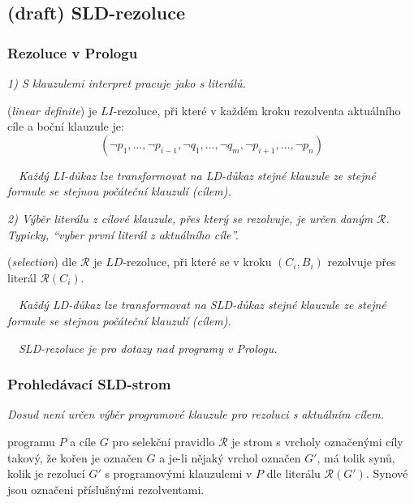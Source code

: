 \subsection{(draft) SLD-rezoluce}\todo



\subsubsection*{Rezoluce v Prologu}
\emph{1) S klauzulemi interpret pracuje jako s  literálů.}


 (\emph{linear definite}) je $LI$-rezoluce, při které v každém kroku rezolventa aktuálního cíle  a boční
klauzule  je:
$$(\neg p_1, \dots, \neg p_{i-1},\neg q_1, \dots, \neg q_m, \neg p_{i+1},\dots, \neg p_n)$$

{\bf {}}\ \ {\it Každý LI-důkaz lze transformovat na LD-důkaz stejné klauzule}
{\it ze stejné formule se stejnou počáteční klauzulí (cílem).}

\medskip

\noindent \emph{2) Výběr literálu z cílové klauzule, přes který se rezolvuje, je určen daným}
\emph{ $\mathcal{R}$. Typicky, ``vyber první literál z aktuálního cíle''.}

 (\emph{selection}) dle $\mathcal{R}$ je $LD$-rezoluce, při které se v kroku $(C_i,B_i)$
rezolvuje přes literál $\mathcal{R}(C_i)$.

\medskip

{\bf {}}\ \ {\it Každý LD-důkaz lze transformovat na SLD-důkaz stejné}
{\it klauzule ze stejné formule se stejnou počáteční klauzulí (cílem).}

\medskip

{\bf {}}\ \ {\it SLD-rezoluce je  pro dotazy nad programy v Prologu.}



\subsubsection*{Prohledávací SLD-strom}
{\it Dosud není určen výběr programové klauzule pro rezoluci s aktuálním cílem.}

 programu $P$ a cíle $G$ pro selekční pravidlo $\mathcal{R}$ je strom s vrcholy označenými cíly takový, že kořen je označen $G$ a je-li nějaký vrchol označen $G'$, má tolik synů, kolik je  rezolucí $G'$ s programovými klauzulemi v $P$ dle literálu $\mathcal{R}(G')$. Synové jsou označeni příslušnými rezolventami.


